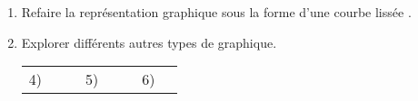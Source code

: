 \documentclass[12pt,a4paper]{article}
\begin{document}
\begin{enumerate}[1{)}]
.\dotfill \vspace{6pt} \\
.\dotfill \vspace{6pt} \\
.\dotfill \vspace{6pt}
\item
Refaire la représentation graphique sous la forme d'une courbe \og lissée \fg{}.
\item
Explorer différents autres types de graphique. \vspace{24pt} \\
\renewcommand{\arraystretch}{2}
\begin{tabular}{l|p{5mm}|p{0.5cm}l|p{5mm}|p{0.5cm}l|p{5mm}|}
\cline{2-2} \cline{5-5} \cline{8-8}
4)&&&5)&&&6)&\\
\cline{2-2} \cline{5-5} \cline{8-8}
\end{tabular} %
\end{enumerate}
\end{document}
